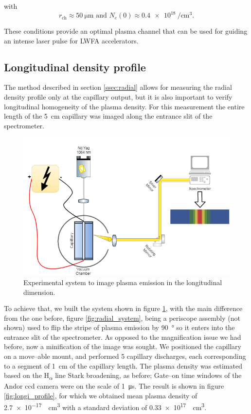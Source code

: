 \documentclass[../main.tex]{subfiles}
\begin{document}
with
\begin{equation}
r_\text{ch}\approx \SI{50}{\um} \text{ and } N_e\left(0\right)\approx \SI{0.4e18}{\per\cubic\cm}.
\end{equation}

These conditions provide an optimal plasma channel that can be used for guiding an intense laser pulse for LWFA accelerators.

\subsection{Longitudinal density profile}\label{ssec:longi}

The method described in section \ref{ssec:radial} allows for measuring the radial density profile only at the capillary output, but it is also important to verify longitudinal homogeneity of the plasma density. For this measurement the entire length of the \SI{5}{\cm} capillary was imaged along the entrance slit of the spectrometer.
\begin{figure}
    \centering
    \includegraphics[width=\textwidth]{figures/spectro/longitudinal_system.png}
    \caption{Experimental system to image plasma emission in the longitudinal dimension.}
    \label{fig:longi_system}
\end{figure}

To achieve that, we built the system shown in figure \ref{fig:longi_system}, with the main difference from the one before, figure \ref{fig:radial_system}, being a periscope assembly (not shown) used to flip the stripe of plasma emission by \SI{90}{\degree} so it enters into the entrance slit of the spectrometer. As opposed to the magnification issue we had before, now a minification of the image was sought. We positioned the capillary on a move--able mount, and performed 5 capillary discharges, each corresponding to a segment of \SI{1}{\cm} of the capillary length. The plasma density was estimated based on the H\textsubscript{$\alpha$} line Stark broadening, as before; Gate--on time windows of the Andor ccd camera were on the scale of \SI{1}{\us}. The result is shown in figure \ref{fig:longi_profile}, for which we obtained mean plasma density of \SI{2.7e-17}{\per\cubic\cm} with a standard deviation of \SI{0.33e17}{\per\cubic\cm}.
\end{document}
